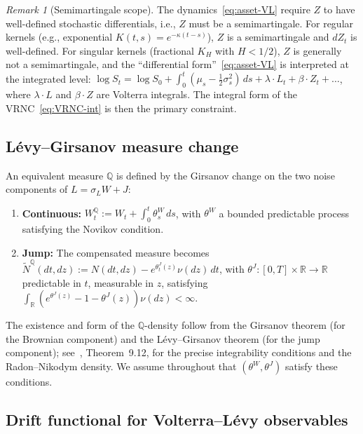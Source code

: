 \documentclass[11pt,a4paper]{article}
\theoremstyle{plain}
\theoremstyle{definition}
\theoremstyle{remark}
\newtheorem{remark}[theorem]{Remark}
\newcommand{\R}{\mathbb{R}}
\newcommand{\QQ}{\mathbb{Q}}
\newcommand{\Ntilde}{\widetilde{N}}
\begin{document}
\begin{remark}[Semimartingale scope]\label{rem:VRNC-scope}
The dynamics~\eqref{eq:asset-VL} require $Z$ to have
well-defined stochastic differentials, i.e., $Z$ must be a
semimartingale.  For regular kernels (e.g., exponential
$K(t,s) = e^{-\kappa(t-s)}$), $Z$ is a semimartingale and
$dZ_t$ is well-defined.  For singular kernels (fractional
$K_H$ with $H < 1/2$), $Z$ is generally not a semimartingale,
and the ``differential form''~\eqref{eq:asset-VL} is
interpreted at the integrated level:
$\log S_t = \log S_0 + \int_0^t(\mu_s - \frac{1}{2}\sigma_s^2)\,ds
+ \lambda \cdot L_t + \beta \cdot Z_t + \ldots$, where
$\lambda \cdot L$ and $\beta \cdot Z$ are Volterra integrals.
The integral form of the VRNC~\eqref{eq:VRNC-int} is then the
primary constraint.
\end{remark}


\subsection{L\'evy--Girsanov measure change}

An equivalent measure $\QQ$ is defined by the Girsanov change on
the two noise components of $L = \sigma_L W + J$:
\begin{enumerate}[label=(\roman*)]
\item \textbf{Continuous:} $W_t^\QQ := W_t + \int_0^t
  \theta_s^W\,ds$, with $\theta^W$ a bounded predictable process
  satisfying the Novikov condition.
\item \textbf{Jump:} The compensated measure becomes
  $\Ntilde^\QQ(dt,dz) := N(dt,dz) - e^{\theta_t^J(z)}\nu(dz)\,dt$,
  with $\theta^J : [0,T] \times \R \to \R$ predictable in $t$,
  measurable in $z$, satisfying
  $\int_\R(e^{\theta^J(z)} - 1 - \theta^J(z))\nu(dz) < \infty$.
\end{enumerate}
The existence and form of the $\QQ$-density follow from
the Girsanov theorem (for the Brownian component) and
the L\'evy--Girsanov theorem (for the jump component);
see~\cite{ContTankov2004}, Theorem~9.12, for the precise
integrability conditions and the Radon--Nikodym density.
We assume throughout that $(\theta^W, \theta^J)$ satisfy
these conditions.


\subsection{Drift functional for Volterra--L\'evy observables}
\end{document}
